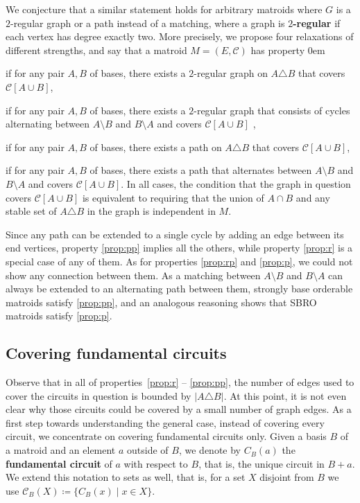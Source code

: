 \documentclass[11pt,a4paper]{article}
\newenvironment{symenum}
 {\enumerate[label=(\noexpand\thisenumsymbol),align=parleft,labelindent=0pt,itemindent=0pt,labelsep=35pt,leftmargin=*]}
 {\endenumerate}
\newcommand\thisenumsymbol{}
\newcommand\itemsymbol[1]{%
  \renewcommand{\thisenumsymbol}{#1}%
  \item
}
\theoremstyle{plain}
\theoremstyle{definition}
\newcommand{\cC}{\mathcal{C}}
\begin{document}
We conjecture that a similar statement holds for arbitrary matroids where $G$ is a $2$-regular graph or a path instead of a matching, where a graph is \textbf{$2$-regular} if each vertex has degree exactly two. More precisely, we propose four relaxations of different strengths, and say that a matroid $M=(E,\cC)$ has property
\begin{symenum}\itemsep0em
    \itemsymbol{R}\label{prop:r} if for any pair $A,B$ of bases, there exists a $2$-regular graph on $A\triangle B$ that covers $\cC[A\cup B]$,
    \itemsymbol{R+}\label{prop:rp} if for any pair $A,B$ of bases, there exists a $2$-regular graph that consists of cycles alternating between $A\setminus B$ and $B\setminus A$ and covers $\cC[A\cup B]$ ,
    \itemsymbol{P}\label{prop:p} if for any pair $A,B$ of bases, there exists a path on $A\triangle B$ that covers $\cC[A\cup B]$,
    \itemsymbol{P+}\label{prop:pp} if for any pair $A,B$ of bases, there exists a path that alternates between $A\setminus B$ and $B\setminus A$ and covers $\cC[A\cup B]$.
\end{symenum}
In all cases, the condition that the graph in question covers $\cC[A\cup B]$ is equivalent to requiring that the union of $A\cap B$ and any stable set of $A\triangle B$ in the graph is independent in $M$.

Since any path can be extended to a single cycle by adding an edge between its end vertices, property \ref{prop:pp} implies all the others, while property \ref{prop:r} is a special case of any of them. As for properties \ref{prop:rp} and \ref{prop:p}, we could not show any connection between them. As a matching between $A\setminus B$ and $B\setminus A$ can always be extended to an alternating path between them, strongly base orderable matroids satisfy \ref{prop:pp}, and an analogous reasoning shows that SBRO matroids satisfy \ref{prop:p}. 

\subsection{Covering fundamental circuits}
\label{sec:bro}

Observe that in all of properties~\ref{prop:r} -- \ref{prop:pp}, the number of edges used to cover the circuits in question is bounded by $|A\triangle B|$. At this point, it is not even clear why those circuits could be covered by a small number of graph edges. As a first step towards understanding the general case, instead of covering every circuit, we concentrate on covering fundamental circuits only. Given a basis $B$ of a matroid and an element $a$ outside of $B$, we denote by $C_B(a)$ the \textbf{fundamental circuit} of $a$ with respect to $B$, that is, the unique circuit in $B+a$. We extend this notation to sets as well, that is, for a set $X$ disjoint from $B$ we use $\cC_B(X)\coloneqq\{C_B(x)\mid x\in X\}$.
\end{document}
